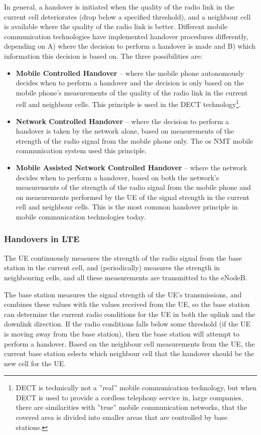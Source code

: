 In general, a handover is initiated when the quality of the radio link in the current cell deteriorates (\eg drop below a specified threshold), and a neighbour cell is available where the quality of the radio link is better. Different mobile communication technologies have implemented handover procedures differently, depending on A) where the decision to perform a handover is made and B) which information this decision is based on. The three possibilities are:

\begin{itemize}
%
\item\textbf{Mobile Controlled Handover} -- where the mobile phone autonomously decides when to perform a handover and the decision is only based on the mobile phone's measurements of the quality of the radio link in the current cell and neighbour cells. This principle is used in the DECT technology\footnote{DECT is technically not a ''real'' mobile communication technology, but when DECT is used to provide a cordless telephony service in, \eg large companies, there are similarities with ''true'' mobile communication networks, \eg that the covered area is divided into smaller areas that are controlled by base stations.}.
%
\item\textbf{Network Controlled Handover} -- where the decision to perform a handover is taken by the network alone, based on measurements of the strength of the radio signal from the mobile phone only. The os NMT mobile communication system used this principle.
%
\item\textbf{Mobile Assisted Network Controlled Handover} -- where the network decides when to perform a handover, based on both the network's measurements of the strength of the radio signal from the mobile phone and on measurements performed by the UE of the signal strength in the current cell and neighbour cells. This is the most common handover principle in mobile communication technologies today.
%
\end{itemize}

\subsubsection{Handovers in LTE}
The UE continuously measures the strength of the radio signal from the base station in the current cell, and (periodically) measures the strength in neighbouring cells, and all these measurements are transmitted to the eNodeB.

The base station measures the signal strength of the UE's transmissions, and combines these values with the values received from the UE, so the base station can determine the current radio conditions for the UE in both the uplink and the downlink direction. If the radio conditions falls below some threshold (\eg if the UE is moving away from the base station), then the base station will attempt to perform a handover. Based on the neighbour cell measurements from the UE, the current base station selects which neighbour cell that the handover should be the new cell for the UE.

